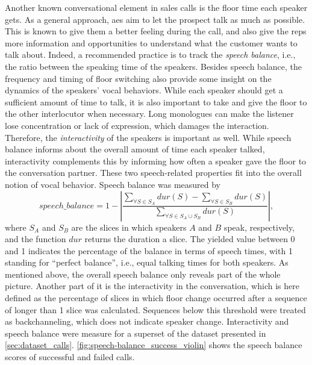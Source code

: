 %
Another known conversational element in sales calls is the floor time each speaker gets.
As a general approach, \acp{ae} aim to let the prospect talk as much as possible.
This is known to give them a better feeling during the call, and also give the reps more information and opportunities to understand what the customer wants to talk about.
Indeed, a recommended practice is to track the \emph{speech balance}, i.e., the ratio between the speaking time of the speakers.
Besides speech balance, the frequency and timing of floor switching also provide some insight on the dynamics of the speakers' vocal behaviors.
While each speaker should get a sufficient amount of time to talk, it is also important to take and give the floor to the other interlocutor when necessary.
Long monologues can make the listener lose concentration or lack of expression, which damages the interaction.
Therefore, the \emph{interactivity} of the speakers is important as well.
While speech balance informs about the overall amount of time each speaker talked, interactivity complements this by informing how often a speaker gave the floor to the conversation partner.
These two speech-related properties fit into the overall notion of vocal behavior.
Speech balance was measured by
%
\begin{equation}
	\label{eq:speech_balance}
	speech\_balance = 
	1 - \left| \frac{\displaystyle \sum_{\forall S \in S_A} dur(S) - 
						\sum_{\forall S \in S_B} dur(S)}
					{\displaystyle \sum_{\forall S \in S_A \cup S_B} dur(S)}
		\right|,
\end{equation}
\noindent
%
where $S_A$ and $S_B$ are the slices in which speakers $A$ and $B$ speak, respectively, and the function $dur$ returns the duration a slice.
The yielded value between 0 and 1 indicates the percentage of the balance in terms of speech times, with 1 standing for \enquote{perfect balance}, i.e., equal talking times for both speakers.
As mentioned above, the overall speech balance only reveals part of the whole picture.
Another part of it is the interactivity in the conversation, which is here defined as the percentage of slices in which floor change occurred after a sequence of longer than 1 slice was calculated.
Sequences below this threshold were treated as backchanneling, which does not indicate speaker change.
Interactivity and speech balance were measure for a superset of the dataset presented in \cref{sec:dataset_calls}.%
\cref{fig:speech-balance_success_violin} shows the speech balance scores of successful and failed calls.
